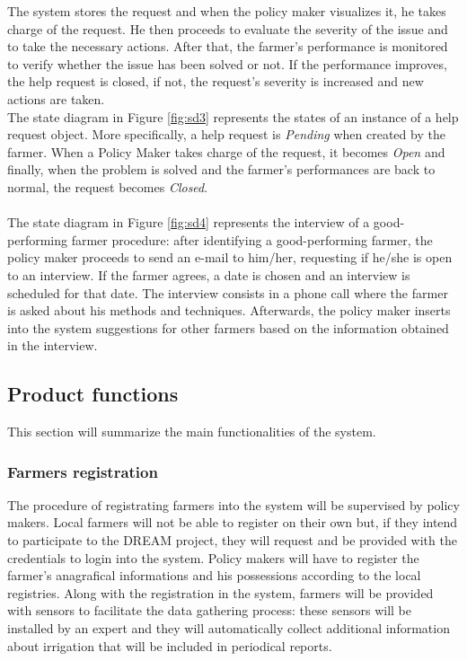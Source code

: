\documentclass[10pt]{article}
\begin{document}
The system stores the request and when the policy maker visualizes it, he takes charge of the request. He then proceeds to evaluate the severity of the issue and to take
the necessary actions. After that, the farmer's performance is monitored to verify whether the issue has been solved or not. If the performance improves, the help request is closed,
if not, the request's severity is increased and new actions are taken.\\
The state diagram in Figure \ref{fig:sd3} represents the states of an instance of a help request object. More specifically, a help request is \textit{Pending} when created by the farmer.
When a Policy Maker takes charge of the request, it becomes \textit{Open} and finally, when the problem is solved and the farmer's performances are back to normal, the request becomes \textit{Closed}.\\\\
The state diagram in Figure \ref{fig:sd4} represents the interview of a good-performing farmer procedure: after identifying a good-performing farmer, the policy
maker proceeds to send an e-mail to him/her, requesting if he/she is open to an interview. If the farmer agrees, a date is chosen and an interview is scheduled for that date.
The interview consists in a phone call where the farmer is asked about his methods and techniques. Afterwards, the policy maker inserts into the system suggestions
for other farmers based on the information obtained in the interview.
\newpage
\subsection{Product functions}
This section will summarize the main functionalities of the system.
\subsubsection{Farmers registration}
The procedure of registrating farmers into the system will be supervised by policy makers. Local farmers will not be able to register on their own
but, if they intend to participate to the DREAM project, they will request and be provided with the credentials to login into the system. Policy makers will have to 
register the farmer's anagrafical informations and his possessions according to the local registries. Along with the registration in the system, farmers will be provided with
sensors to facilitate the data gathering process: these sensors will be installed by an expert and they will automatically collect additional information about irrigation that 
will be included in periodical reports.
\end{document}
